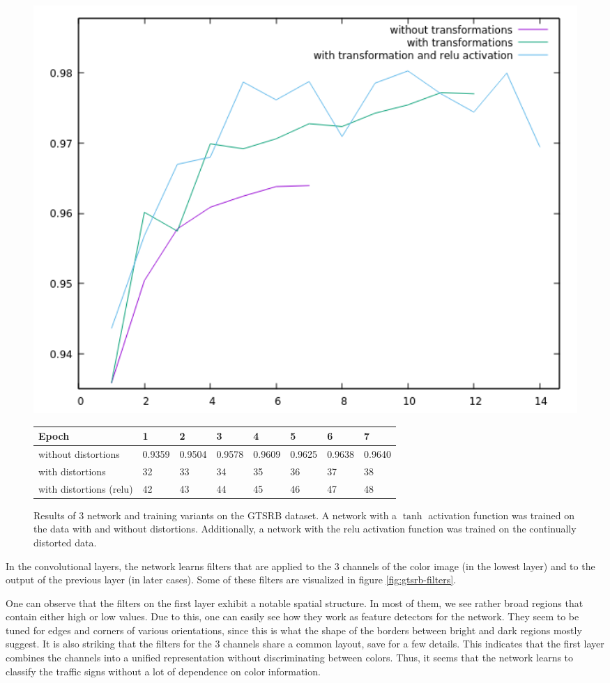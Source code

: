 \documentclass[11pt, a4paper]{article}
\begin{document}
\begin{figure}[h!]
	\centering
	\includegraphics[width=1\textwidth]{gtsrb_results}
	\begin{tabular}{|l|lllllll|}
		\hline
		Epoch & 1 & 2 & 3 & 4 & 5 & 6 & 7\\
		\hline
		without distortions & 0.9359 & 0.9504 & 0.9578 & 0.9609 & 0.9625 & 0.9638 & 0.9640\\
		with distortions & 32 & 33 & 34 & 35 & 36 & 37 & 38\\
		with distortions (relu) & 42 & 43 & 44 & 45 & 46 & 47 & 48\\
		\hline
	\end{tabular}
	\caption{Results of 3 network and training variants on the GTSRB dataset. A network with a $\tanh$ activation function was trained on the data with and without distortions. Additionally, a network with the relu activation function was trained on the continually distorted data.}
	\label{fig:gtsrb-results}
\end{figure}

In the convolutional layers, the network learns filters that are applied to the 3 channels of the color image (in the lowest layer) and to the output of the previous layer (in later cases). Some of these filters are visualized in figure \ref{fig:gtsrb-filters}.

One can observe that the filters on the first layer exhibit a notable spatial structure. In most of them, we see rather broad regions that contain either high or low values. Due to this, one can easily see how they work as feature detectors for the network. They seem to be tuned for edges and corners of various orientations, since this is what the shape of the borders between bright and dark regions mostly suggest. It is also striking that the filters for the 3 channels share a common layout, save for a few details. This indicates that the first layer combines the channels into a unified representation without discriminating between colors. Thus, it seems that the network learns to classify the traffic signs without a lot of dependence on color information. %
\end{document}
